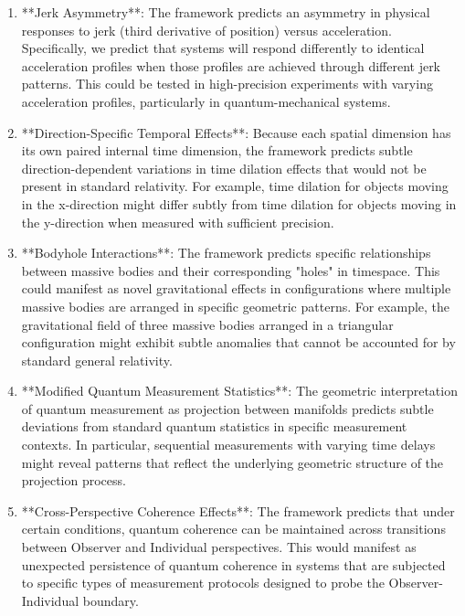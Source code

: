 \documentclass{article}
\begin{document}
\begin{enumerate}
\item **Jerk Asymmetry**: The framework predicts an asymmetry in physical responses to jerk (third derivative of position) versus acceleration. Specifically, we predict that systems will respond differently to identical acceleration profiles when those profiles are achieved through different jerk patterns. This could be tested in high-precision experiments with varying acceleration profiles, particularly in quantum-mechanical systems.

\item **Direction-Specific Temporal Effects**: Because each spatial dimension has its own paired internal time dimension, the framework predicts subtle direction-dependent variations in time dilation effects that would not be present in standard relativity. For example, time dilation for objects moving in the x-direction might differ subtly from time dilation for objects moving in the y-direction when measured with sufficient precision.

\item **Bodyhole Interactions**: The framework predicts specific relationships between massive bodies and their corresponding "holes" in timespace. This could manifest as novel gravitational effects in configurations where multiple massive bodies are arranged in specific geometric patterns. For example, the gravitational field of three massive bodies arranged in a triangular configuration might exhibit subtle anomalies that cannot be accounted for by standard general relativity.

\item **Modified Quantum Measurement Statistics**: The geometric interpretation of quantum measurement as projection between manifolds predicts subtle deviations from standard quantum statistics in specific measurement contexts. In particular, sequential measurements with varying time delays might reveal patterns that reflect the underlying geometric structure of the projection process.

\item **Cross-Perspective Coherence Effects**: The framework predicts that under certain conditions, quantum coherence can be maintained across transitions between Observer and Individual perspectives. This would manifest as unexpected persistence of quantum coherence in systems that are subjected to specific types of measurement protocols designed to probe the Observer-Individual boundary.
\end{enumerate}
\end{document}
